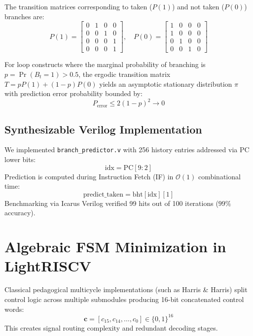 \documentclass[10pt,twocolumn]{article}
\begin{document}
The transition matrices corresponding to taken ($P(1)$) and not taken ($P(0)$) branches are:
\begin{equation}
P(1) = \begin{bmatrix}
0 & 1 & 0 & 0 \\
0 & 0 & 1 & 0 \\
0 & 0 & 0 & 1 \\
0 & 0 & 0 & 1
\end{bmatrix}, \quad
P(0) = \begin{bmatrix}
1 & 0 & 0 & 0 \\
1 & 0 & 0 & 0 \\
0 & 1 & 0 & 0 \\
0 & 0 & 1 & 0
\end{bmatrix}
\end{equation}

For loop constructs where the marginal probability of branching is $p = \Pr(B_t = 1) > 0.5$, the ergodic transition matrix $T = p P(1) + (1-p) P(0)$ yields an asymptotic stationary distribution $\pi$ with prediction error probability bounded by:
\begin{equation}
P_{\text{error}} \le 2(1-p)^2 \to 0
\end{equation}

\subsection{Synthesizable Verilog Implementation}

We implemented \texttt{branch\_predictor.v} with 256 history entries addressed via PC lower bits:
\begin{equation}
\text{idx} = \text{PC}[9:2]
\end{equation}
Prediction is computed during Instruction Fetch (IF) in $\mathcal{O}(1)$ combinational time:
\begin{equation}
\text{predict\_taken} = \text{bht}[\text{idx}][1]
\end{equation}
Benchmarking via Icarus Verilog verified 99 hits out of 100 iterations ($99\%$ accuracy).

\section{Algebraic FSM Minimization in LightRISCV}

Classical pedagogical multicycle implementations (such as Harris \& Harris) split control logic across multiple submodules producing 16-bit concatenated control words:
\begin{equation}
\mathbf{c} = [c_{15}, c_{14}, \dots, c_0] \in \{0, 1\}^{16}
\end{equation}
This creates signal routing complexity and redundant decoding stages.
\end{document}
